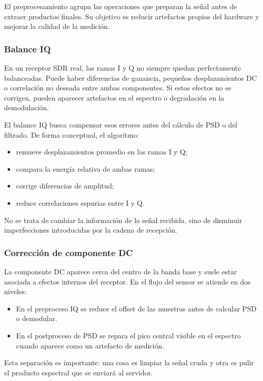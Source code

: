 El preprocesamiento agrupa las operaciones que preparan la señal antes de extraer
productos finales. Su objetivo es reducir artefactos propios del hardware y
mejorar la calidad de la medición.

\subsubsection{Balance IQ}

En un receptor SDR real, las ramas I y Q no siempre quedan perfectamente
balanceadas. Puede haber diferencias de ganancia, pequeños desplazamientos DC o
correlación no deseada entre ambas componentes. Si estos efectos no se corrigen,
pueden aparecer artefactos en el espectro o degradación en la demodulación.

El balance IQ busca compensar esos errores antes del cálculo de PSD o del filtrado.
De forma conceptual, el algoritmo:

\begin{itemize}
  \item remueve desplazamientos promedio en las ramas I y Q;
  \item compara la energía relativa de ambas ramas;
  \item corrige diferencias de amplitud;
  \item reduce correlaciones espurias entre I y Q.
\end{itemize}

No se trata de cambiar la información de la señal recibida, sino de disminuir
imperfecciones introducidas por la cadena de recepción.

\subsubsection{Corrección de componente DC}

La componente DC aparece cerca del centro de la banda base y suele estar asociada
a efectos internos del receptor. En el flujo del sensor se atiende en dos niveles:

\begin{itemize}
  \item En el preproceso IQ se reduce el offset de las muestras antes de calcular
  PSD o demodular.
  \item En el postproceso de PSD se repara el pico central visible en el espectro
  cuando aparece como un artefacto de medición.
\end{itemize}

Esta separación es importante: una cosa es limpiar la señal cruda y otra es pulir
el producto espectral que se enviará al servidor.

